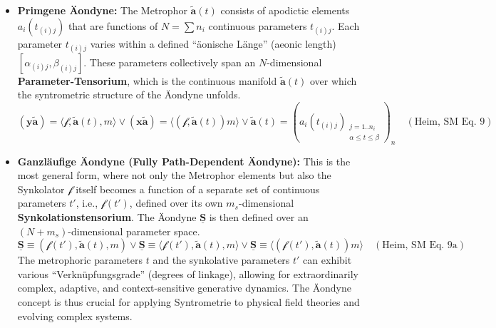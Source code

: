 \documentclass[
    12pt,              %
    a4paper,           %
    headings=normal,   %
    twoside=true,      %
    BCOR=8mm,          %
]{scrbook}
\newcommand{\q}[1]{\enquote{#1}}
\newcommand{\syntrix}{\bm{y\widetilde{a}}}
\newcommand{\homogeneoussyntrix}{\bm{x\widetilde{a}}}
\newcommand{\metrophor}{\bm{\widetilde{a}}}
\newcommand{\synkolator}{\mathcal{f}}
\newcommand{\synkolationsstufe}{m}
\begin{document}
\begin{itemize}
    \item   \textbf{Primgene Äondyne:} The Metrophor \(\metrophor(t)\) consists of apodictic elements \(a_i(t_{(i)j})\) that are functions of \(N = \sum n_i\) continuous parameters \(t_{(i)j}\). Each parameter \(t_{(i)j}\) varies within a defined \q{äonische Länge} (aeonic length) \([\alpha_{(i)j}, \beta_{(i)j}]\). These parameters collectively span an \(N\)-dimensional \textbf{Parameter-Tensorium}, which is the continuous manifold \(\metrophor(t)\) over which the syntrometric structure of the Äondyne unfolds.
        \begin{equation} \label{eq:original_primigene_aeondyne} 
        (\syntrix) = \langle \synkolator, \metrophor(t), \synkolationsstufe \rangle \lor (\homogeneoussyntrix) = \langle (\synkolator, \metrophor(t)) \synkolationsstufe \rangle \lor \metrophor(t) = (a_i(t_{(i)j})_{\substack{j=1..n_i \\ \alpha \le t \le \beta}})_n \quad (\text{Heim, SM Eq. 9})
        \end{equation}

    \item   \textbf{Ganzläufige Äondyne (Fully Path-Dependent Äondyne):} This is the most general form, where not only the Metrophor elements but also the Synkolator \(\synkolator\) itself becomes a function of a separate set of continuous parameters \(t'\), i.e., \(\synkolator(t')\), defined over its own \(m_s\)-dimensional \textbf{Synkolationstensorium}. The Äondyne \(\underline{\bm{S}}\) is then defined over an \((N+m_s)\)-dimensional parameter space.
        \begin{equation} \label{eq:original_ganzlaeufige_aeondyne} 
        \underline{\bm{S}} \equiv (\synkolator(t'), \metrophor(t), \synkolationsstufe) \lor \underline{\bm{S}} \equiv \langle \synkolator(t'), \metrophor(t), \synkolationsstufe \rangle \lor \underline{\bm{S}} \equiv \langle (\synkolator(t'), \metrophor(t)) \synkolationsstufe \rangle \quad (\text{Heim, SM Eq. 9a})
        \end{equation}
        The metrophoric parameters \(t\) and the synkolative parameters \(t'\) can exhibit various \q{Verknüpfungsgrade} (degrees of linkage), allowing for extraordinarily complex, adaptive, and context-sensitive generative dynamics. The Äondyne concept is thus crucial for applying Syntrometrie to physical field theories and evolving complex systems.
\end{itemize}
\end{document}
